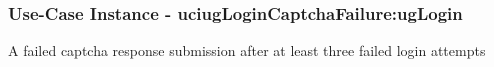 
	\subsubsection{Use-Case Instance - uciugLoginCaptchaFailure:ugLogin}
	
	A failed captcha response submission after at least three failed login attempts		  
	\begin{operationmodel}
	
	\end{operationmodel} 

	
